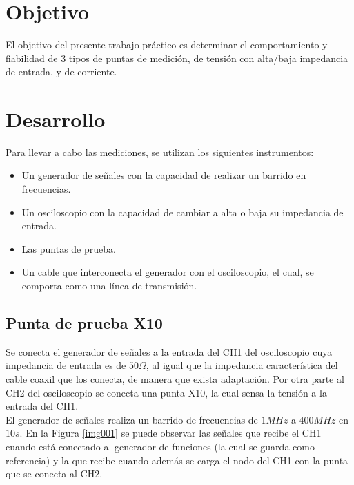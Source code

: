 \documentclass[a4paper,10pt]{article}
\title{  }
\begin{document}
	\maketitle %
	\newpage

	\tableofcontents %
	\newpage


	\section{Objetivo}
	
	\indent	El objetivo del presente trabajo práctico es determinar el 
	comportamiento y fiabilidad de 3 tipos de puntas de medición, de tensión 
	con alta/baja impedancia de entrada, y de corriente.
	
	\newpage
	\section{Desarrollo}
		\indent Para llevar a cabo las mediciones, se utilizan los siguientes
		instrumentos:
		\begin{itemize}
			\item Un generador de señales con la capacidad de realizar un 
			barrido en frecuencias.
			\item Un osciloscopio con la capacidad de cambiar a alta o baja su
			impedancia de entrada.
			\item Las puntas de prueba.
			\item Un cable que interconecta el generador con el osciloscopio,
			el cual, se comporta como una línea de transmisión.
		\end{itemize}
				 
		\subsection{Punta de prueba X10}
		\indent Se conecta el generador de se\~nales a la entrada del CH1 del
		osciloscopio cuya impedancia de entrada es de $50 \Omega$, al igual 
		que la impedancia caracter\'istica del cable coaxil que los conecta, 
		de manera que exista adaptaci\'on. Por otra parte al CH2 del 
		osciloscopio se conecta una punta X10, la cual sensa la tensi\'on a la
		entrada del CH1. \\
		\indent El generador de se\~nales realiza un barrido de frecuencias de
		$1MHz$ a $400MHz$ en $10s$. En la Figura \ref{img001} se puede 
		observar las se\~nales que recibe el CH1 cuando est\'a conectado al 
		generador de funciones (la cual se guarda como referencia) y la que 
		recibe cuando adem\'as se carga el nodo del CH1 con la punta que se 
		conecta al CH2.
		
\end{document}
